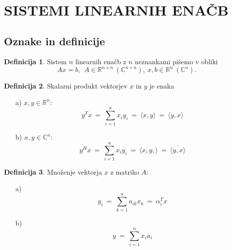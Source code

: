 \documentclass[11pt]{article}
\theoremstyle{definition}
\newtheorem{definicija}{Definicija}[section]
\begin{document}

\pagebreak


\section{SISTEMI LINEARNIH ENAČB}
\vspace{0.5cm}


\subsection{Oznake in definicije}
\vspace{0.5cm}

\begin{definicija}

Sistem $n$ linearnih enačb z $n$ neznankami pišemo v obliki
$$Ax = b, ~~A \in \mathbb{R}^{n \times n} ~(\mathbb{C}^{n \times n}), ~x, b \in \mathbb{R}^n ~(\mathbb{C}^n).$$

\end{definicija}
\vspace{0.5cm}

\begin{definicija}

Skalarni produkt vektorjev $x$ in $y$ je enaka
\begin{enumerate}
	\item[a)] $x, y \in \mathbb{R}^n$:
	$$y^T x ~=~ \sum_{i=1}^n x_i y_i ~=~ \langle x, y \rangle ~=~ \langle y, x \rangle$$
	\item[b)] $x, y \in \mathbb{C}^n$:
	$$y^H x ~=~ \sum_{i=1}^n x_i \overline{y_i} ~=~ \langle x, y, \rangle ~=~ \overline{\langle y, x \rangle}$$
\end{enumerate}

\end{definicija}
\vspace{0.5cm}

\begin{definicija}

Množenje vektorja $x$ z matriko $A$:
\begin{enumerate}
	\item[a)] $$y_i ~=~ \sum_{k=1}^n a_{ik} x_k ~=~ \alpha_i^T x$$
	\item[b)] $$y ~=~ \sum_{i=1}^n x_i a_i$$
\end{enumerate}

\end{definicija}
\vspace{0.5cm}
\end{document}
